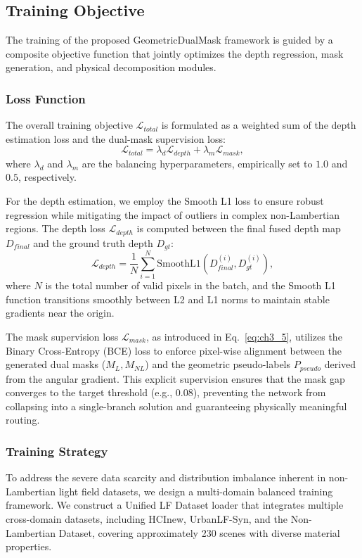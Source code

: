 \documentclass[lettersize,journal]{IEEEtran}
\begin{document}
\subsection{Training Objective}

The training of the proposed GeometricDualMask framework is guided by a composite objective function that jointly optimizes the depth regression, mask generation, and physical decomposition modules. 

\subsubsection{Loss Function}
The overall training objective $\mathcal{L}_{total}$ is formulated as a weighted sum of the depth estimation loss and the dual-mask supervision loss:
\begin{equation}
    \mathcal{L}_{total} = \lambda_d \mathcal{L}_{depth} + \lambda_m \mathcal{L}_{mask},
    \label{eq:ch3_6}
\end{equation}
where $\lambda_d$ and $\lambda_m$ are the balancing hyperparameters, empirically set to $1.0$ and $0.5$, respectively. 

For the depth estimation, we employ the Smooth L1 loss to ensure robust regression while mitigating the impact of outliers in complex non-Lambertian regions. The depth loss $\mathcal{L}_{depth}$ is computed between the final fused depth map $D_{final}$ and the ground truth depth $D_{gt}$:
\begin{equation}
    \mathcal{L}_{depth} = \frac{1}{N} \sum_{i=1}^{N} \text{SmoothL1}(D_{final}^{(i)}, D_{gt}^{(i)}),
    \label{eq:ch3_7}
\end{equation}
where $N$ is the total number of valid pixels in the batch, and the Smooth L1 function transitions smoothly between L2 and L1 norms to maintain stable gradients near the origin.

The mask supervision loss $\mathcal{L}_{mask}$, as introduced in Eq.~\ref{eq:ch3_5}, utilizes the Binary Cross-Entropy (BCE) loss to enforce pixel-wise alignment between the generated dual masks ($M_L, M_{NL}$) and the geometric pseudo-labels $P_{pseudo}$ derived from the angular gradient. This explicit supervision ensures that the mask gap converges to the target threshold (e.g., $0.08$), preventing the network from collapsing into a single-branch solution and guaranteeing physically meaningful routing.

\subsubsection{Training Strategy}
To address the severe data scarcity and distribution imbalance inherent in non-Lambertian light field datasets, we design a multi-domain balanced training framework. We construct a Unified LF Dataset loader that integrates multiple cross-domain datasets, including HCInew, UrbanLF-Syn, and the Non-Lambertian Dataset, covering approximately 230 scenes with diverse material properties. 
\end{document}
